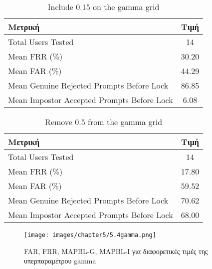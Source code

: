 \begin{table}[H]
\centering
\begin{tabular}{|l|c|}
\hline
\textbf{Μετρική}                                 & \textbf{Τιμή}   \\ \hline
Total Users Tested                               & 14             \\ \hline
Mean FRR (\%)                                    & 30.20          \\ \hline
Mean FAR (\%)                                    & 44.29          \\ \hline
Mean Genuine Rejected Prompts Before Lock       & 86.85          \\ \hline
Mean Impostor Accepted Prompts Before Lock      & 6.08           \\ \hline
\end{tabular}
\caption{Include 0.15 on the gamma grid}
\end{table}

\begin{table}[H]
\centering
\begin{tabular}{|l|c|}
\hline
\textbf{Μετρική}                                 & \textbf{Τιμή}   \\ \hline
Total Users Tested                               & 14             \\ \hline
Mean FRR (\%)                                    & 17.80          \\ \hline
Mean FAR (\%)                                    & 59.52          \\ \hline
Mean Genuine Rejected Prompts Before Lock       & 70.62          \\ \hline
Mean Impostor Accepted Prompts Before Lock      & 68.00          \\ \hline
\end{tabular}
\caption{Remove 0.5 from the gamma grid}
\end{table}

\begin{figure}[H]
    \centering
    \texttt{[image: images/chapter5/5.4gamma.png]}
    \caption{FAR, FRR, MAPBL-G, MAPBL-I για διαφορετικές τιμές της υπερπαραμέτρου gamma}
    \label{fig:chapter5_image54gamma}
\end{figure}

